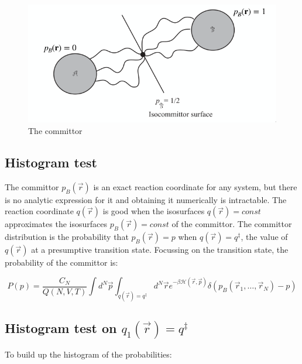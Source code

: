 \begin{figure}[H]
	\includegraphics[width=\textwidth]{committor-distribution}
	\caption{The committor}
	\label{fig:committor-distribution}
\end{figure}

	\subsection{Histogram test}
	The committor $p_B(\vec{r})$ is an exact reaction coordinate for any system, but there is no analytic expression for it and obtaining it numerically is intractable.
	The reaction coordinate $q(\vec{r})$ is good when the isosurfaces $q(\vec{r}) = const$ approximates the isosurfaces $p_B(\vec{r})= const$ of the committor.
	The committor distribution is the probability that $p_B(\vec{r}) = p$ when $q(\vec{r}) = q^{\ddagger}$, the value of $q(\vec{r})$ at a presumptive transition state.
	Focussing on the transition state, the probability of the committor is:

	$$P(p) = \frac{C_N}{Q(N, V, T)}\int d^N\vec{p}\int_{q(\vec{r})=q^{\ddagger}}d^N\vec{r}e^{-\beta\mathcal{H}(\vec{r}, \vec{p})}\delta(p_B(\vec{r}_1, \dots, \vec{r}_N)-p)$$

	\subsection{Histogram test on $q_1(\vec{r}) = q^{\ddagger}$}
	To build up the histogram of the probabilities:

